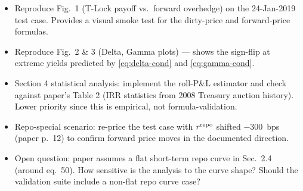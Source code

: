 \documentclass[11pt,a4paper]{article}
\begin{document}
\begin{todobox}
\begin{itemize}[noitemsep]
  \item Reproduce Fig.~1 (T-Lock payoff vs.\ forward overhedge) on the
        24-Jan-2019 test case. Provides a visual smoke test for the
        dirty-price and forward-price formulas.
  \item Reproduce Fig.~2 \& 3 (Delta, Gamma plots) --- shows the
        sign-flip at extreme yields predicted by \eqref{eq:delta-cond}
        and \eqref{eq:gamma-cond}.
  \item Section 4 statistical analysis: implement the roll-P\&L
        estimator and check against paper's Table 2 (IRR statistics
        from 2008 Treasury auction history). Lower priority since
        this is empirical, not formula-validation.
  \item Repo-special scenario: re-price the test case with $r^{\mathrm{repo}}$ shifted
        $-300$~bps (paper p.~12) to confirm forward price moves in the
        documented direction.
  \item Open question: paper assumes a flat short-term repo curve in
        Sec.~2.4 (around eq.~50). How sensitive is the analysis to
        the curve shape? Should the validation suite include a
        non-flat repo curve case?
\end{itemize}
\end{todobox}
\end{document}
